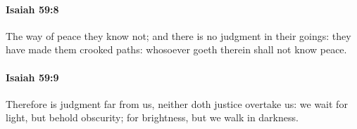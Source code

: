 		\paragraph{Isaiah 59:8} %
			\label{ISAIAH-59-8}

			The way of peace they know not; and there is no judgment in their goings: they have made them crooked paths: whosoever goeth therein shall not know peace.


		\paragraph{Isaiah 59:9} %
			\label{ISAIAH-59-9}

			Therefore is judgment far from us, neither doth justice overtake us: we wait for light, but behold obscurity; for brightness, but we walk in darkness.


